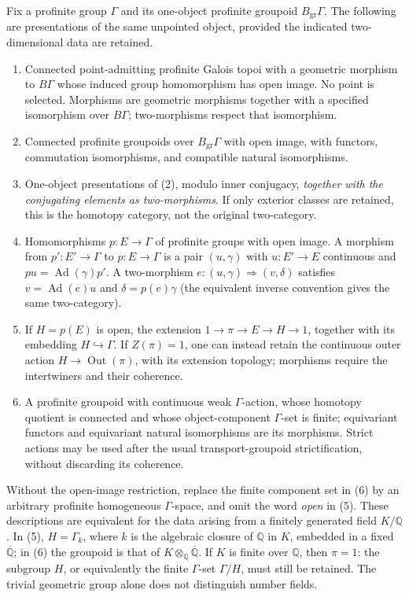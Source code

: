 Fix a profinite group $\Gamma$ and its one-object profinite groupoid
$B_{\mathrm{gr}}\Gamma$. The following are presentations of the same
unpointed object, provided the indicated two-dimensional data are retained.
\begin{enumerate}
\item Connected point-admitting profinite Galois topoi with a geometric morphism to
$B\Gamma$ whose induced group homomorphism has open image. No point is
selected. Morphisms are geometric morphisms together with a specified
isomorphism over $B\Gamma$; two-morphisms respect that isomorphism.
\item Connected profinite groupoids over $B_{\mathrm{gr}}\Gamma$ with open image, with functors,
commutation isomorphisms, and compatible natural isomorphisms.
\item One-object presentations of (2), modulo inner conjugacy, \emph{together
with the conjugating elements as two-morphisms}. If only exterior classes
are retained, this is the homotopy category, not the original two-category.
\item Homomorphisms $p:E\to\Gamma$ of profinite groups with open image. A morphism from
$p':E'\to\Gamma$ to $p:E\to\Gamma$ is a pair $(u,\gamma)$ with
$u:E'\to E$ continuous and $p u=\operatorname{Ad}(\gamma)p'$.
A two-morphism $e:(u,\gamma)\Rightarrow(v,\delta)$ satisfies
$v=\operatorname{Ad}(e)u$ and $\delta=p(e)\gamma$ (the equivalent inverse
convention gives the same two-category).
\item If $H=p(E)$ is open, the extension $1\to\pi\to E\to H\to1$, together
with its embedding $H\hookrightarrow\Gamma$. If $Z(\pi)=1$, one can instead
retain the continuous outer action $H\to\operatorname{Out}(\pi)$, with its
extension topology; morphisms require the intertwiners and their coherence.
\item A profinite groupoid with continuous weak $\Gamma$-action, whose
homotopy quotient is connected and whose object-component $\Gamma$-set is
finite; equivariant functors and equivariant natural isomorphisms are its
morphisms. Strict actions may be used after the usual transport-groupoid
strictification, without discarding its coherence.
\end{enumerate}
Without the open-image restriction, replace the finite component set in (6)
by an arbitrary profinite homogeneous $\Gamma$-space, and omit the word \emph{open} in (5).
These descriptions are equivalent for the data arising from a finitely
generated field $K/\mathbb Q$. In (5), $H=\Gamma_k$, where $k$ is the
algebraic closure of $\mathbb Q$ in $K$, embedded in a fixed
$\overline{\mathbb Q}$; in (6) the groupoid is that of
$K\otimes_{\mathbb Q}\overline{\mathbb Q}$. If $K$ is finite over
$\mathbb Q$, then $\pi=1$: the subgroup $H$, or equivalently the finite
$\Gamma$-set $\Gamma/H$, must still be retained. The trivial geometric group
alone does not distinguish number fields.


